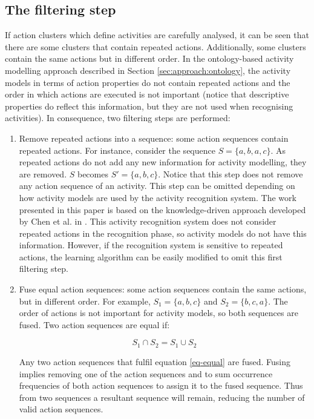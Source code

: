 \subsection{The filtering step}
\label{subsec:learner:filtering}

If action clusters which define activities are carefully analysed, it can be seen that there are some clusters that contain repeated actions. Additionally, some clusters contain the same actions but in different order. In the ontology-based activity modelling approach described in Section \ref{sec:approach:ontology}, the activity models in terms of action properties do not contain repeated actions and the order in which actions are executed is not important (notice that descriptive properties do reflect this information, but they are not used when recognising activities). In consequence, two filtering steps are performed:

\begin{enumerate}
 \item Remove repeated actions into a sequence: some action sequences contain repeated actions. For instance, consider the sequence $S=\{a, b, a, c\}$. As repeated actions do not add any new information for activity modelling, they are removed. $S$ becomes $S' = \{a, b, c\}$. Notice that this step does not remove any action sequence of an activity. This step can be omitted depending on how activity models are used by the activity recognition system. The work presented in this paper is based on the knowledge-driven approach developed by Chen et al. in \cite{Chen2012a}. This activity recognition system does not consider repeated actions in the recognition phase, so activity models do not have this information. However, if the recognition system is sensitive to repeated actions, the learning algorithm can be easily modified to omit this first filtering step.
 
 \item Fuse equal action sequences: some action sequences contain the same actions, but in different order. For example, $S_1 = \{a, b, c \}$ and $S_2 = \{b, c, a\}$. The order of actions is not important for activity models, so both sequences are fused. Two action sequences are equal if:
 
 \begin{equation}
 \label{eq-equal}
  S_1 \cap S_2 = S_1 \cup S_2
 \end{equation}

 Any two action sequences that fulfil equation \ref{eq-equal} are fused. Fusing implies removing one of the action sequences and to sum occurrence frequencies of both action sequences to assign it to the fused sequence. Thus from two sequences a resultant sequence will remain, reducing the number of valid action sequences.

\end{enumerate}

